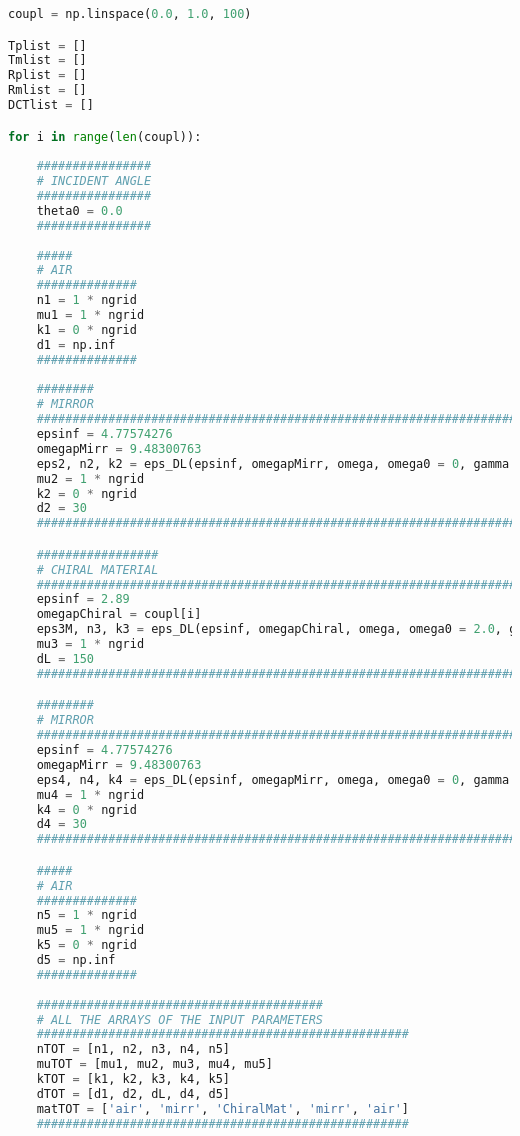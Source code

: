 \documentclass[showpacs,aps,prl,onecolumn,superscriptaddress]{revtex4-1}
\begin{document}
\begin{lstlisting}[language=Python, caption=Layers of a standard FP.]
coupl = np.linspace(0.0, 1.0, 100)

Tplist = []
Tmlist = []
Rplist = []
Rmlist = []
DCTlist = []

for i in range(len(coupl)):
 
    ################
    # INCIDENT ANGLE
    ################
    theta0 = 0.0
    ################
    
    #####
    # AIR
    ##############
    n1 = 1 * ngrid
    mu1 = 1 * ngrid
    k1 = 0 * ngrid
    d1 = np.inf
    ##############
    
    ########
    # MIRROR
    ########################################################################################
    epsinf = 4.77574276
    omegapMirr = 9.48300763
    eps2, n2, k2 = eps_DL(epsinf, omegapMirr, omega, omega0 = 0, gamma = 0.17486845, k0 = 0)
    mu2 = 1 * ngrid
    k2 = 0 * ngrid
    d2 = 30
    ########################################################################################   

    #################
    # CHIRAL MATERIAL
    ##########################################################################################
    epsinf = 2.89
    omegapChiral = coupl[i]
    eps3M, n3, k3 = eps_DL(epsinf, omegapChiral, omega, omega0 = 2.0, gamma = 0.05, k0 = 1e-3)
    mu3 = 1 * ngrid
    dL = 150
    ########################################################################################## 

    ########
    # MIRROR
    ########################################################################################
    epsinf = 4.77574276
    omegapMirr = 9.48300763
    eps4, n4, k4 = eps_DL(epsinf, omegapMirr, omega, omega0 = 0, gamma = 0.17486845, k0 = 0)
    mu4 = 1 * ngrid
    k4 = 0 * ngrid
    d4 = 30
    ######################################################################################## 

    #####
    # AIR
    ##############
    n5 = 1 * ngrid
    mu5 = 1 * ngrid
    k5 = 0 * ngrid
    d5 = np.inf
    ##############
    
    ########################################
    # ALL THE ARRAYS OF THE INPUT PARAMETERS
    ####################################################
    nTOT = [n1, n2, n3, n4, n5]
    muTOT = [mu1, mu2, mu3, mu4, mu5]
    kTOT = [k1, k2, k3, k4, k5] 
    dTOT = [d1, d2, dL, d4, d5] 
    matTOT = ['air', 'mirr', 'ChiralMat', 'mirr', 'air']
    ####################################################
    

\end{lstlisting}
\end{document}
